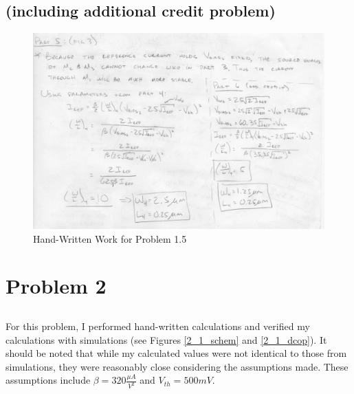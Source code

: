\documentclass{article}
\begin{document}
\subsection{(including additional credit problem)}
\begin{figure}[H]
\centering
\includegraphics[width=6in]{1_3b}
\caption{Hand-Written Work for Problem 1.5}
\label{1_5}
\end{figure}
\newpage

\section{Problem 2}
\subsection{}
For this problem, I performed hand-written calculations and verified my calculations with simulations (see Figures \ref{2_1_schem} and \ref{2_1_dcop}). It should be noted that while my calculated values were not identical to those from simulations, they were reasonably close considering the assumptions made. These assumptions include $\beta = 320\frac{\mu A}{V^2}$ and $V_{th} = 500mV$.
\end{document}

